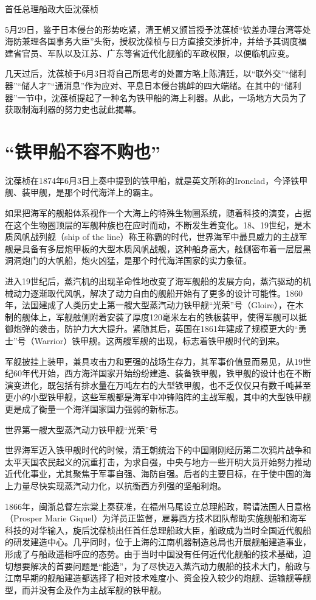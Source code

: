 \documentclass[12pt,UTF8]{ctexbook}
\begin{document}
首任总理船政大臣沈葆桢

5月29日，鉴于日本侵台的形势吃紧，清王朝又颁旨授予沈葆桢“钦差办理台湾等处海防兼理各国事务大臣”头衔，授权沈葆桢与日方直接交涉折冲，并给予其调度福建省官员、军队以及江苏、广东等省近代化舰船的军政权限，以便临机应变。

几天过后，沈葆桢于6月3日将自己所思考的处置方略上陈清廷，以“联外交”“储利器”“储人才”“通消息”作为应对、平息日本侵台挑衅的四大端绪。在其中的“储利器”一节中，沈葆桢提起了一种名为铁甲船的海上利器。从此，一场地方大员为了获取制海利器的努力史也就此揭幕。

\section{“铁甲船不容不购也”}

沈葆桢在1874年6月3日上奏中提到的铁甲船，就是英文所称的Ironclad，今译铁甲舰、装甲舰，是那个时代海洋上的霸主。

如果把海军的舰船体系视作一个大海上的特殊生物圈系统，随着科技的演变，占据在这个生物圈顶层的军舰种族也在应时而动，不断发生着变化。18、19世纪，是木质风帆战列舰（ship of the line）称王称霸的时代，世界海军中最具威力的主战军舰是具备有多层炮甲板的大型木质风帆战舰，这种船身高大，舷侧密布着一层层黑洞洞炮门的大帆船，炮火凶猛，是那个时代海洋国家的实力象征。

进入19世纪后，蒸汽机的出现革命性地改变了海军舰船的发展方向，蒸汽驱动的机械动力逐渐取代风帆，解决了动力自由的舰船开始有了更多的设计可能性。1860年，法国建成了人类历史上第一艘大型蒸汽动力铁甲舰“光荣”号（Gloire），在木制的舰体上，军舰舷侧附着安装了厚度120毫米左右的铁板装甲，使得军舰可以抵御炮弹的袭击，防护力大大提升。紧随其后，英国在1861年建成了规模更大的“勇士”号（Warrior）铁甲舰。这两艘军舰的出现，标志着铁甲舰时代的到来。

军舰披挂上装甲，兼具攻击力和更强的战场生存力，其军事价值显而易见，从19世纪60年代开始，西方海洋国家开始纷纷建造、装备铁甲舰，铁甲舰的设计也在不断演变进化，既包括有排水量在万吨左右的大型铁甲舰，也不乏仅仅只有数千吨甚至更小的小型铁甲舰，这些军舰都是海军中冲锋陷阵的主战军舰，其中的大型铁甲舰更是成了衡量一个海洋国家国力强弱的新标志。

世界第一艘大型蒸汽动力铁甲舰“光荣”号

世界海军迈入铁甲舰时代的时候，清王朝统治下的中国刚刚经历第二次鸦片战争和太平天国农民起义的沉重打击，为求自强，中央与地方一些开明大员开始努力推动近代化事业，尤其聚焦于军事自强、海防自强。后者的主要目标，在于使中国的海上力量尽快实现蒸汽动力化，以抗衡西方列强的坚船利炮。

1866年，闽浙总督左宗棠上奏获准，在福州马尾设立总理船政，聘请法国人日意格（Prosper Marie Giquel）为洋员正监督，雇募西方技术团队帮助实施舰船和海军科技的对华输入，旋后沈葆桢出任首任总理船政大臣，船政成为当时全国近代舰船的研发建造中心。几乎同时，位于上海的江南机器制造总局也开展舰船建造事业，形成了与船政遥相呼应的态势。由于当时中国没有任何近代化舰船的技术基础，迫切想要解决的首要问题是“能造”，为了尽快迈入蒸汽动力舰船的技术大门，船政与江南早期的舰船建造都选择了相对技术难度小、资金投入较少的炮舰、运输舰等舰型，而并没有企及作为主战军舰的铁甲舰。
\end{document}
